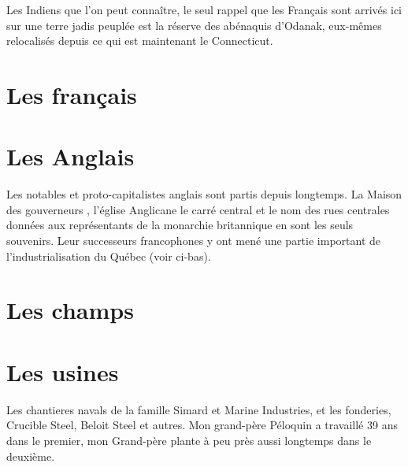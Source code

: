 \documentclass[12pt]{report}
\begin{document}
Les Indiens que l'on peut connaître, le seul rappel que les Français sont arrivés ici sur une terre jadis peuplée est la réserve des abénaquis d'Odanak, eux-mêmes relocalisés depuis ce qui est maintenant le Connecticut. 

\chapter{Les français}


\chapter{Les Anglais}

Les notables et proto-capitalistes anglais sont partis depuis longtemps. La \og Maison des gouverneurs \fg, l'église Anglicane le carré central et le nom des rues centrales données aux représentants de la monarchie britannique en sont les seuls souvenirs. Leur successeurs francophones y ont mené une partie important de l'industrialisation du Québec (voir ci-bas). 


\chapter{Les champs}


\chapter{Les usines}

Les chantieres navals de la famille Simard et Marine Industries, et les fonderies, Crucible Steel, Beloit Steel et autres. Mon grand-père Péloquin a travaillé 39 ans dans le premier, mon Grand-père plante à peu près aussi longtemps dans le deuxième. 
\end{document}
